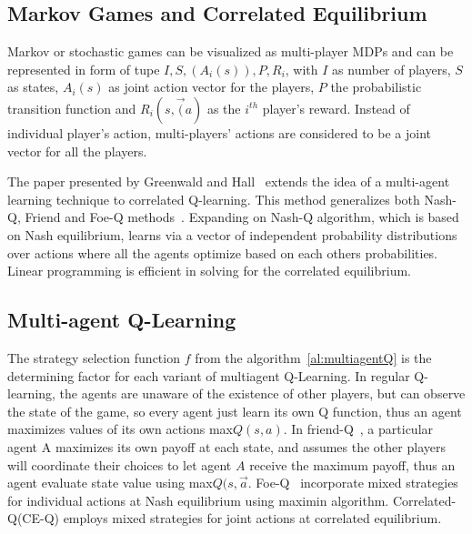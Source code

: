 \documentclass[conference]{IEEEtran}
\begin{document}
\subsection{Markov Games and Correlated Equilibrium}

Markov or stochastic games can be visualized as multi-player MDPs and can be represented in form of tupe $I,S,(A_i(s)), P, R_i$, with $I$ as number of players, $S$ as states, $A_i(s)$ as joint action vector for the players, $P$ the probabilistic transition function and $R_i(s,\vec(a)$ as the $i^{th}$ player's reward. Instead of individual player's action, multi-players' actions are considered to be a joint vector for all the players.

The paper presented by Greenwald and Hall~\cite{b1} extends the idea of a multi-agent learning technique to correlated Q-learning. This method generalizes both Nash-Q, Friend and Foe-Q methods~\cite{b2}\cite{b3}. Expanding on Nash-Q algorithm, which is based on Nash equilibrium, learns via a vector of independent probability distributions over actions where all the agents optimize based on each others probabilities. Linear programming is efficient in solving for the correlated equilibrium.

\subsection{Multi-agent Q-Learning}

The strategy selection function $f$ from the algorithm~\ref{al:multiagentQ} is the determining factor for each variant of multiagent Q-Learning. In regular Q-learning, the agents are unaware of the existence of other players, but can observe the state of the game, so every agent just learn its own Q function, thus an agent maximizes values of its own actions max$Q(s,a)$. In friend-Q~\cite{b3}, a particular agent A maximizes its own payoff at each state, and assumes the other players will coordinate their choices to let agent $A$ receive the maximum payoff, thus an agent evaluate state value using max$Q(s,\vec{a}$. Foe-Q~\cite{b3} incorporate mixed strategies for individual actions at Nash equilibrium using maximin algorithm. Correlated-Q(CE-Q) employs mixed strategies for joint actions at correlated equilibrium.
\end{document}
